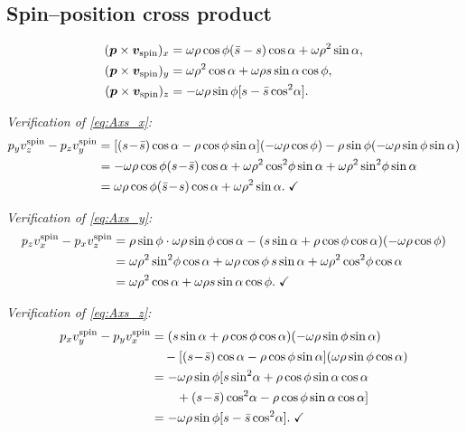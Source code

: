 \documentclass[11pt]{article}
\newcommand{\vect}[1]{\bm{#1}}
\begin{document}
\subsection{Spin--position cross product}

\begin{align}
(\vect{p}\times\vect{v}_{\rm spin})_x
&= \omega\rho\cos\phi(\bar{s}-s)\cos\alpha + \omega\rho^2\sin\alpha,
  \label{eq:Axs_x}\\
(\vect{p}\times\vect{v}_{\rm spin})_y
&= \omega\rho^2\cos\alpha + \omega\rho s\sin\alpha\cos\phi,
  \label{eq:Axs_y}\\
(\vect{p}\times\vect{v}_{\rm spin})_z
&= -\omega\rho\sin\phi[s-\bar{s}\cos^2\!\alpha].
  \label{eq:Axs_z}
\end{align}

\emph{Verification of \eqref{eq:Axs_x}:}
\begin{align*}
p_y v_z^{\rm spin}-p_z v_y^{\rm spin}
&= [(s\!-\!\bar{s})\cos\alpha-\rho\cos\phi\sin\alpha](-\omega\rho\cos\phi)
  -\rho\sin\phi(-\omega\rho\sin\phi\sin\alpha) \\
&= -\omega\rho\cos\phi(s\!-\!\bar{s})\cos\alpha
  +\omega\rho^2\cos^2\!\phi\sin\alpha
  +\omega\rho^2\sin^2\!\phi\sin\alpha \\
&= \omega\rho\cos\phi(\bar{s}\!-\!s)\cos\alpha+\omega\rho^2\sin\alpha.\;\checkmark
\end{align*}

\emph{Verification of \eqref{eq:Axs_y}:}
\begin{align*}
p_z v_x^{\rm spin}-p_x v_z^{\rm spin}
&= \rho\sin\phi\cdot\omega\rho\sin\phi\cos\alpha
  -(s\sin\alpha+\rho\cos\phi\cos\alpha)(-\omega\rho\cos\phi) \\
&= \omega\rho^2\sin^2\!\phi\cos\alpha
  +\omega\rho\cos\phi\,s\sin\alpha
  +\omega\rho^2\cos^2\!\phi\cos\alpha \\
&= \omega\rho^2\cos\alpha+\omega\rho s\sin\alpha\cos\phi.\;\checkmark
\end{align*}

\emph{Verification of \eqref{eq:Axs_z}:}
\begin{align*}
p_x v_y^{\rm spin}-p_y v_x^{\rm spin}
&= (s\sin\alpha+\rho\cos\phi\cos\alpha)(-\omega\rho\sin\phi\sin\alpha) \\
&\quad-[(s\!-\!\bar{s})\cos\alpha-\rho\cos\phi\sin\alpha](\omega\rho\sin\phi\cos\alpha) \\
&= -\omega\rho\sin\phi[s\sin^2\!\alpha+\rho\cos\phi\sin\alpha\cos\alpha \\
&\qquad+(s\!-\!\bar{s})\cos^2\!\alpha-\rho\cos\phi\sin\alpha\cos\alpha] \\
&= -\omega\rho\sin\phi[s-\bar{s}\cos^2\!\alpha].\;\checkmark
\end{align*}
\end{document}
